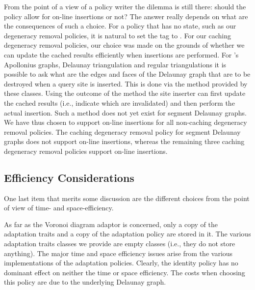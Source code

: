 From the point of a view of a policy writer the dilemma is still
there: should the policy allow for on-line insertions or not? The
answer really depends on what are the consequences of such a
choice. For a policy that has no state, such as our degeneracy removal
policies, it is natural to set the  tag to
. For our caching degeneracy removal policies, our
choice was made on the grounds of whether we can update the cached
results efficiently when insertions are performed. For \cgal's
Apollonius graphs, Delaunay triangulation and regular triangulations
it is possible to ask what are the edges and faces of the Delaunay
graph that are to be destroyed when a query site is inserted. This is
done via the  method provided by these
classes. Using the outcome of the  method the site
inserter can first update the cached results (i.e., indicate which are
invalidated) and then perform the actual insertion. Such a method does
not yet exist for segment Delaunay graphs. We have thus chosen to
support on-line insertions for all non-caching degeneracy removal
policies. The caching degeneracy removal policy for segment Delaunay
graphs does not support on-line insertions, whereas the remaining
three caching degeneracy removal policies support on-line insertions.




\subsection*{Efficiency Considerations\label{subsec:vda2-efficiency}}

One last item that merits some discussion are the different choices
from the point of view of time- and space-efficiency.

As far as the Voronoi diagram adaptor is concerned, only a copy of the
adaptation traits and a copy of the adaptation policy are stored in it.
The various adaptation traits classes we provide are empty
classes (i.e., they do not store anything). The major time and space
efficiency issues arise from the various implementations of the
adaptation policies.
%
Clearly, the identity policy has no dominant effect on neither the
time or space efficiency. The costs when choosing this policy are due
to the underlying Delaunay graph.

